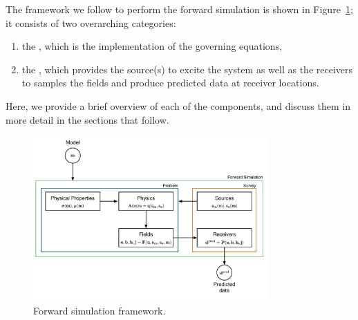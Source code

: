 The framework we follow to perform the forward simulation is shown in
Figure~\ref{fig:simpegFwd}; it consists of two overarching categories:
\begin{enumerate}
\item the \Problem, which is the implementation of the governing equations,
\item the \Survey, which provides the source(s) to excite the system as well as the receivers to samples the fields and produce predicted data at receiver locations.
\end{enumerate}
Here, we provide a brief overview of each of the components, and discuss them
in more detail in the sections that follow.
{%
\begin{figure}[htb!]
    \centering
    \includegraphics[width=0.8\textwidth]{images/simpegEM_withMath_6.png}
\caption{Forward simulation framework.}
\label{fig:simpegFwd}
\end{figure}
}

